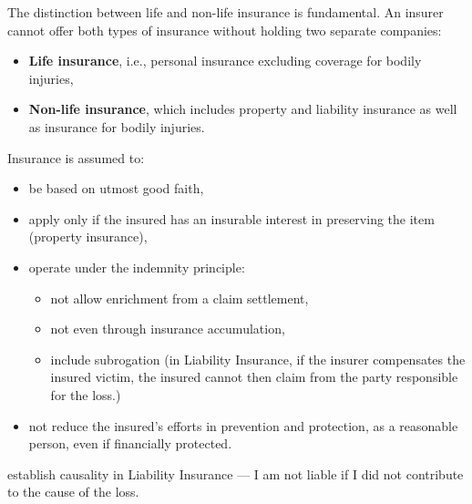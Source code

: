 \begin{f}
	
The distinction between life and non-life insurance is fundamental. An insurer cannot offer both types of insurance without holding two separate companies: 	
\begin{itemize}
	\item \textbf{Life insurance}, i.e., personal insurance excluding coverage for bodily injuries,
	\item \textbf{Non-life insurance}, which includes property and liability insurance as well as insurance for bodily injuries.
\end{itemize}
\end{f}


\begin{f}
	
	
Insurance is assumed to:
	\begin{itemize}
		\item be based on utmost good faith,
		\item apply only if the insured has an insurable interest in preserving the item (property insurance),
		\item operate under the indemnity principle:
		\begin{itemize}
			\item not allow enrichment from a claim settlement,
			\item not even through insurance accumulation,
			\item include subrogation (in Liability Insurance, if the insurer compensates the insured victim, the insured cannot then claim from the party responsible for the loss.)
		\end{itemize}
		\item not reduce the insured’s efforts in prevention and protection, as a reasonable person, even if financially protected.
	\end{itemize}
	\item establish causality in Liability Insurance — I am not liable if I did not contribute to the cause of the loss.
\end{f}


